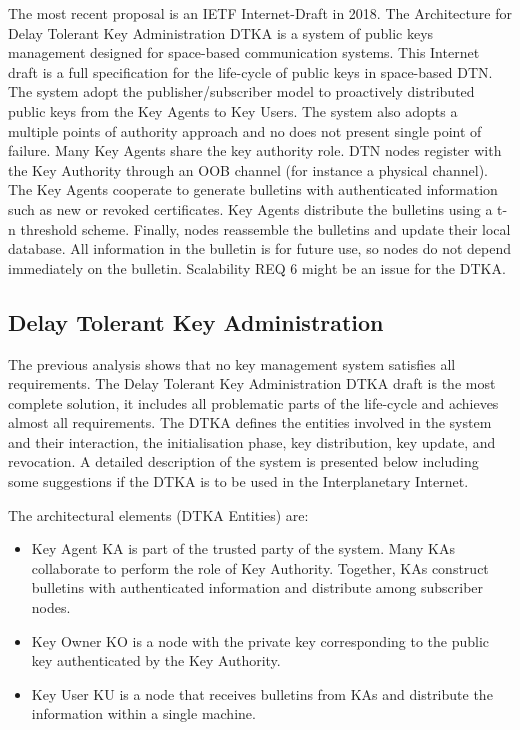 The most recent proposal is an IETF Internet-Draft \cite{burleigh-dtnwg-dtka-01} in 2018. The Architecture for Delay Tolerant Key Administration DTKA is a system of public keys management designed for space-based communication systems. This Internet draft is a full specification for the life-cycle of public keys in space-based DTN. The system adopt the publisher/subscriber model to proactively distributed public keys from the Key Agents to Key Users. The system also adopts a  multiple points of authority approach and no does not present single point of failure. Many Key Agents share the key authority role. DTN nodes register with the Key Authority through an OOB channel (for instance a physical channel). The Key Agents cooperate to generate bulletins with authenticated information such as new or revoked certificates. Key Agents distribute the bulletins using a t-n threshold scheme. Finally, nodes reassemble the bulletins and update their local database. All information in the bulletin is for future use, so nodes do not depend immediately on the bulletin. Scalability REQ 6 might be an issue for the DTKA.




\subsection{Delay Tolerant Key Administration}

The previous analysis shows that no key management system satisfies all requirements. The Delay Tolerant Key Administration DTKA draft is the most complete solution, it includes all problematic parts of the life-cycle and achieves almost all requirements. The DTKA defines the entities involved in the system and their interaction, the initialisation phase, key distribution, key update, and revocation. A detailed description of the system is presented below including some suggestions if the DTKA is to be used in the Interplanetary Internet.

The architectural elements (DTKA Entities) are:

\begin{itemize}
  \item  Key Agent KA is part of the trusted party of the system. Many KAs collaborate to perform the role of Key Authority. Together, KAs construct bulletins with authenticated information and distribute among subscriber nodes.
  \item Key Owner KO is a node with the private key corresponding to the public key authenticated by the Key Authority.
  \item Key User KU is a node that receives bulletins from KAs and distribute the information within a single machine.
\end{itemize}

